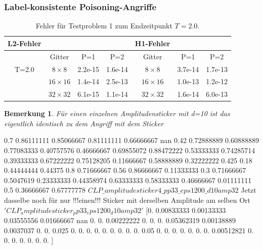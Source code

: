 \documentclass[twoside, 11pt,a4paper]{article}
\newtheorem{remark}[theorem]{Bemerkung}
\numberwithin{equation}{section}
\begin{document}
	\subsubsection{Label-konsistente Poisoning-Angriffe}
	\begin{table}[h]
		\begin{center}
			\begin{tabular}{| c c c c | c c c |}
				\hline
				\textbf{L2-Fehler} & & & & \textbf{H1-Fehler} & & \\
				\hline 
				& Gitter & P=1 & P=2 & Gitter & P=1 & P=2  \\
				
				\hline
				
				T=2.0 	&$8 \times 8 $ & 2.2e-15 & 1.6e-14 & $8 \times 8 $ & 3.7e-14 & 1.7e-13 \\
				&$16\times 16$ & 1.4e-14 & 2.5e-13 & $16\times 16$ & 1.0e-13 & 1.2e-12 \\
				&$32\times 32$ & 6.1e-15 & 1.1e-14 & $32\times 32$ & 1.6e-14 & 6.0e-13 \\
				\hline
			\end{tabular}
			\caption{Fehler für Testproblem 1 zum Endzeitpunkt $T=2.0$.}
			\label{errors_testproblem1}
		\end{center}
	\end{table}
	
	\begin{remark}
		Für einen einzelnen Amplitudensticker mit d=10 ist das eigentlich identisch zu dem Angriff mit dem Sticker
	\end{remark}
	0.7        0.86111111 0.85066667 0.81111111 0.66666667        nan
	0.42       0.72888889 0.60888889 0.77083333 0.40757576 0.46666667
	0.69855072 0.88472222 0.53333333 0.74285714 0.39333333 0.67222222
	0.75128205 0.11666667 0.58888889 0.32222222 0.425      0.18
	0.44444444 0.44375    0.8        0.71666667 0.56       0.86666667
	0.11333333 0.3        0.71666667 0.5047619  0.23333333 0.44358974
	0.63333333 0.58333333 0.46666667 0.01111111 0.5        0.36666667
	0.67777778
	$CLP\_amplitudesticker4\_pp33\_eps1200\_d10amp32$
	Jetzt dasselbe noch für nur !!!einen!!! Sticker mit derselben Amplitude am selben Ort
	$'CLP_amplitudesticker_pp33_eps1200_d10amp32'$
	[0.         0.00833333 0.00133333 0.03555556 0.01666667        nan
	0.         0.         0.00222222 0.         0.         0.
	0.05362319 0.00138889 0.0037037  0.         0.         0.025
	0.         0.         0.         0.         0.         0.
	0.         0.         0.         0.05       0.         0.
	0.         0.         0.         0.         0.         0.00512821
	0.         0.         0.         0.         0.         0.
	0.        ]
	
\end{document}
